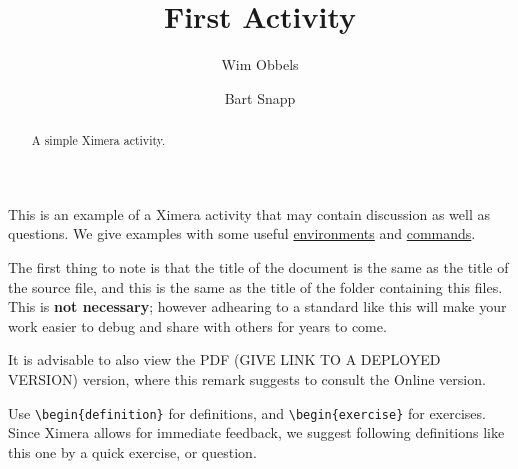 \documentclass{ximera}
\author{Wim Obbels \and Bart Snapp}
\title{First Activity}
\begin{document}
\begin{abstract}
    A simple Ximera activity.
\end{abstract}
\maketitle
\label{xim:firstActivity}

This is an example of a Ximera activity that may contain discussion as well as
questions. We give examples
with some useful \hyperref[xim:ximeraEnvironments]{environments} and
\hyperref[xim:ximeraCommands]{commands}.

The first thing to note is that the title of the document is the same as the
title of the source file, and this is the same as the title of the folder
containing this files.
This is \textbf{not necessary}; however adhearing to a standard like this will
make your work easier to debug and share with others for years to come.

\begin{onlineOnly}
    \begin{remark}
        It is advisable to also view the PDF (GIVE LINK TO A DEPLOYED VERSION)
        version, where this remark
        suggests to
        consult the Online version.
    \end{remark}
\end{onlineOnly}

Use \verb|\begin{definition}| for definitions, and \verb|\begin{exercise}| for
exercises. Since Ximera allows for immediate feedback, we suggest following
definitions like this one by a quick exercise, or question.
\end{document}
